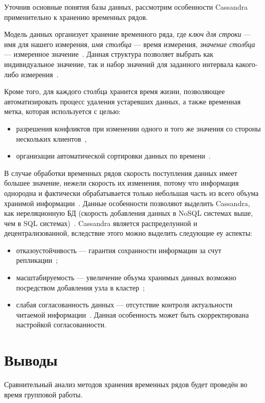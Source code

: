 Уточнив основные понятия базы данных, рассмотрим особенности Cassandra применительно к хранению временных рядов.

Модель данных организует хранение временного ряда, где
\textit{ключ для строки} --- имя для нашего измерения,
\textit{имя столбца} --- время измерения,
\textit{значение столбца} --- измеренное значение~\cite{myref5}.
Данная структура позволяет выбрать как индивидуальное значение, так и набор значений для заданного интервала какого-либо измерения~\cite{myref5}.

Кроме того, для каждого столбца хранится время жизни, позволяющее автоматизировать процесс удаления устаревших данных, а также временная метка, которая используется с целью:

\begin{itemize}
\item разрешения конфликтов при изменении одного и того же значения со стороны нескольких клиентов~\cite{myref3},
\item организации автоматической сортировки данных по времени~\cite{myref5}. 
\end{itemize}

В случае обработки временных рядов скорость поступления данных имеет большее значение, нежели скорость их изменения,
потому что информация однородна и фактически обрабатывается только небольшая часть из всего объума хранимой информации~\cite{myref5}.
Данные особенности позволяют выделить Cassandra, как нереляционную БД (скорость добавления данных в NoSQL системах выше, чем в SQL системах)~\cite{myref5}.
Cassandra является распределунной и децентрализованной, вследствие этого можно выделить следующие еу аспекты:
\begin{itemize}
\item отказоустойчивость --- гарантия сохранности информации за счут репликации~\cite{myref6};
\item масштабируемость --- увеличение объума хранимых данных возможно посредством добавления узла в кластер~\cite{myref6};
\item слабая согласованность данных --- отсутствие контроля актуальности читаемой информации~\cite{myref3}.
Данная особенность может быть скорректирована настройкой согласованности. 
\end{itemize}

\section{Выводы}
Сравнительный анализ методов хранения временных рядов будет
проведён во время групповой работы.


